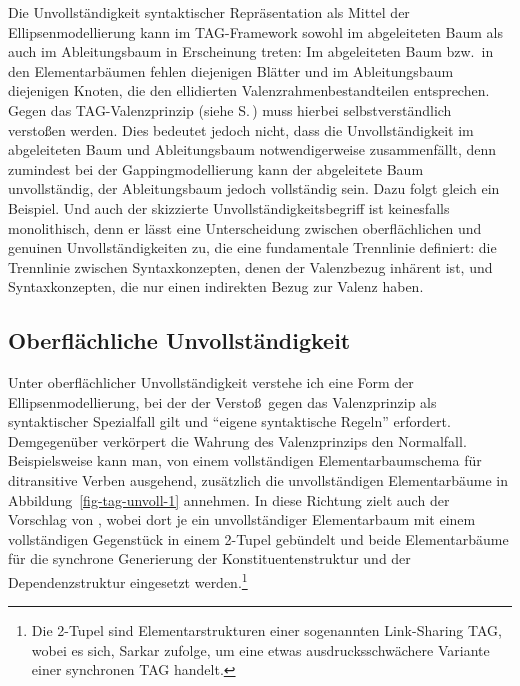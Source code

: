 Die Unvollständigkeit syntaktischer Repräsentation als Mittel der Ellipsenmodellierung kann im TAG-Framework sowohl im abgeleiteten Baum als auch im Ableitungsbaum in Erscheinung treten: Im abgeleiteten Baum bzw.\ in den Elementarbäumen fehlen diejenigen Blätter und im Ableitungsbaum diejenigen Knoten, die den ellidierten Valenzrahmenbestandteilen entsprechen. Gegen das TAG-Valenzprinzip (siehe S.\,\pageref{ex-valenzprinzip-tag}) muss hierbei selbstverständlich versto\ss en werden. Dies bedeutet jedoch nicht, dass die Unvollständigkeit im abgeleiteten Baum und Ableitungsbaum notwendigerweise zusammenfällt, denn zumindest bei der Gappingmodellierung kann der abgeleitete Baum unvollständig, der Ableitungsbaum jedoch vollständig sein. Dazu folgt gleich ein Beispiel. Und auch der skizzierte  Unvollständigkeitsbegriff ist keinesfalls monolithisch, denn er lässt eine Unterscheidung zwischen oberflächlichen und genuinen Unvollständigkeiten zu, die eine fundamentale Trennlinie definiert: die Trennlinie zwischen Syntaxkonzepten, denen der Valenzbezug inhärent ist, und Syntaxkonzepten, die nur einen indirekten Bezug zur Valenz haben.


\subsection{Oberflächliche Unvollständigkeit}

Unter oberflächlicher Unvollständigkeit verstehe ich eine Form der Ellipsenmodellierung, bei der der Versto\ss\ gegen das Valenzprinzip als syntaktischer Spezialfall gilt und "`eigene syntaktische Regeln"' \citep{Klein:93} erfordert. Demgegenüber verkörpert die Wahrung des Valenzprinzips den Normalfall. Beispielsweise kann man, von einem vollständigen Elementarbaumschema für ditransitive Verben ausgehend, zusätzlich die unvollständigen Elementarbäume in Abbildung~\ref{fig-tag-unvoll-1} annehmen. In diese Richtung zielt auch der Vorschlag von \cite{Sarkar:97}, wobei dort je ein unvollständiger Elementarbaum mit einem vollständigen Gegenstück in einem 2-Tupel gebündelt und beide Elementarbäume für die synchrone Generierung der Konstituentenstruktur und der Dependenzstruktur eingesetzt werden.\footnote{Die 2-Tupel sind Elementarstrukturen einer sogenannten Link-Sharing TAG, wobei es sich, Sarkar zufolge, um eine etwas ausdrucksschwächere Variante einer synchronen TAG \citep{Shieber:Schabes:90} handelt.} 

